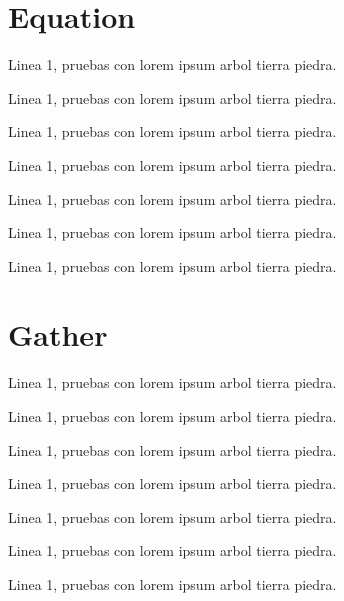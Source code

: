 \newpage
\section{Equation}
Linea 1, pruebas con lorem ipsum arbol tierra piedra.


Linea 1, pruebas con lorem ipsum arbol tierra piedra.


Linea 1, pruebas con lorem ipsum arbol tierra piedra.


Linea 1, pruebas con lorem ipsum arbol tierra piedra.


Linea 1, pruebas con lorem ipsum arbol tierra piedra.


Linea 1, pruebas con lorem ipsum arbol tierra piedra.


Linea 1, pruebas con lorem ipsum arbol tierra piedra.

\newpage
\section{Gather}

Linea 1, pruebas con lorem ipsum arbol tierra piedra.


Linea 1, pruebas con lorem ipsum arbol tierra piedra.


Linea 1, pruebas con lorem ipsum arbol tierra piedra.

\insertgather[\label{gather1}]{arg2}

Linea 1, pruebas con lorem ipsum arbol tierra piedra.


Linea 1, pruebas con lorem ipsum arbol tierra piedra.


Linea 1, pruebas con lorem ipsum arbol tierra piedra.


Linea 1, pruebas con lorem ipsum arbol tierra piedra.

